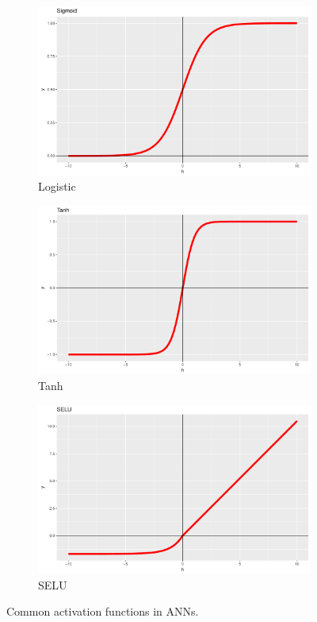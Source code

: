 \documentclass[preprint,5p,compress]{elsarticle}
\begin{document}
\begin{figure}[htp!]
	\begin{subfigure}[t]{0.3\textwidth}
		\centering
		\includegraphics[width=\linewidth]{Sigmoid.pdf} 
		\caption{Logistic} \label{Fig.Sigmoid}
	\end{subfigure}
	\begin{subfigure}[t]{0.3\textwidth}
		\centering
		\includegraphics[width=\linewidth]{Tanh.pdf} 
		\caption{Tanh} \label{Fig.Tanh}
	\end{subfigure}
	\begin{subfigure}[t]{0.3\textwidth}
		\centering
		\includegraphics[width=\linewidth]{SELU.pdf} 
		\caption{SELU} \label{Fig.SELU}
	\end{subfigure}

	\caption{Common activation functions in ANNs.}
	\label{Fig.ActivationFunctions}
\end{figure}
\end{document}
